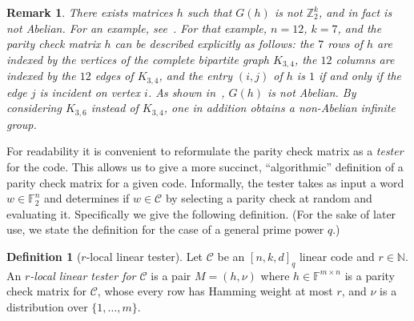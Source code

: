\documentclass[11pt]{article}
\newtheorem{remark}[theorem]{Remark}
\theoremstyle{definition}
\newtheorem{definition}[theorem]{Definition}
\newcommand{\code}{\mathscr{C}}
\newcommand{\N}{\ensuremath{\mathbb{N}}}
\newcommand{\F}{\ensuremath{\mathbb{F}}}
\newcommand{\Z}{\ensuremath{\mathbb{Z}}}
\begin{document}
\begin{remark}\label{rk:non-abelian}
There exists matrices $h$ such that $G(h)$ is not $\Z_2^k$, and in fact is not Abelian. For an example, see~\cite[Example 2.16]{paddock2022arkhipov}. For that example, $n=12$, $k=7$, and the parity check matrix $h$ can be described explicitly as follows: the $7$ rows of $h$ are indexed by the vertices of the complete bipartite graph $K_{3,4}$, the $12$ columns are indexed by the $12$ edges of $K_{3,4}$, and the entry $(i,j)$ of $h$ is $1$ if and only if the edge $j$ is incident on vertex $i$. As shown in~\cite{paddock2022arkhipov}, $G(h)$ is not Abelian. By considering $K_{3,6}$ instead of $K_{3,4}$, one in addition obtains a non-Abelian \emph{infinite} group. 
\end{remark}


For readability it is convenient to reformulate the parity check matrix as a \emph{tester} for the code. This allows us to give a more succinct, ``algorithmic'' definition of a parity check matrix for a given code. Informally, the tester takes as input a word $w\in \F_2^n$ and determines if $w\in \code$ by selecting a parity check at random and evaluating it. 
 Specifically we give the following definition. (For the sake of later use, we state the definition for the case of a general prime power $q$.)

\begin{definition}[$r$-local linear tester]\label{def:code-test}
Let $\code$ be an $[n,k,d]_q$ linear code and $r\in \N$.
An \emph{$r$-local linear tester for $\code$} is a pair $M = (h,\nu)$ where $h \in \F^{m \times n}$ is a parity check matrix for $\code$, whose every row has Hamming weight at most $r$, and $\nu$ is a distribution over $\{1,\ldots,m\}$. 
\end{definition}
\end{document}
